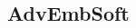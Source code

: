 \documentclass[10pt,a4paper,landscape]{article}
\begin{document}
\begin{multicols*}{3}
    \section*{AdvEmbSoft}
    
    
    
    
    
    
\end{multicols*}
\end{document}
